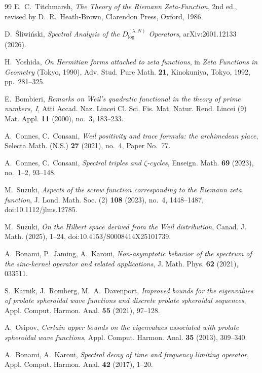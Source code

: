 \documentclass[11pt,a4paper]{article}
\begin{document}
\begin{thebibliography}{99}
E.~C.~Titchmarsh,
\emph{The Theory of the Riemann Zeta-Function}, 2nd ed., revised by
D.~R.~Heath-Brown, Clarendon Press, Oxford, 1986.

D.~\'Sliwi\'nski,
\emph{Spectral Analysis of the $D_{\log}^{(\lambda,N)}$ Operators},
arXiv:2601.12133 (2026).

H.~Yoshida,
\emph{On Hermitian forms attached to zeta functions}, in \emph{Zeta Functions
in Geometry} (Tokyo, 1990), Adv. Stud. Pure Math. \textbf{21}, Kinokuniya,
Tokyo, 1992, pp.~281--325.

E.~Bombieri,
\emph{Remarks on Weil's quadratic functional in the theory of prime numbers, I},
Atti Accad. Naz. Lincei Cl. Sci. Fis. Mat. Natur. Rend. Lincei (9) Mat. Appl.
\textbf{11} (2000), no.~3, 183--233.

A.~Connes, C.~Consani,
\emph{Weil positivity and trace formula: the archimedean place},
Selecta Math. (N.S.) \textbf{27} (2021), no.~4, Paper No.~77.

A.~Connes, C.~Consani,
\emph{Spectral triples and $\zeta$-cycles},
Enseign. Math. \textbf{69} (2023), no.~1--2, 93--148.

M.~Suzuki,
\emph{Aspects of the screw function corresponding to the Riemann zeta function},
J. Lond. Math. Soc. (2) \textbf{108} (2023), no.~4, 1448--1487,
doi:10.1112/jlms.12785.

M.~Suzuki,
\emph{On the Hilbert space derived from the Weil distribution},
Canad. J. Math. (2025), 1--24, doi:10.4153/S0008414X25101739.

A.~Bonami, P.~Jaming, A.~Karoui,
\emph{Non-asymptotic behavior of the spectrum of the sinc-kernel operator and
related applications}, J. Math. Phys. \textbf{62} (2021), 033511.

S.~Karnik, J.~Romberg, M.~A.~Davenport,
\emph{Improved bounds for the eigenvalues of prolate spheroidal wave functions
and discrete prolate spheroidal sequences},
Appl. Comput. Harmon. Anal. \textbf{55} (2021), 97--128.

A.~Osipov,
\emph{Certain upper bounds on the eigenvalues associated with prolate
spheroidal wave functions},
Appl. Comput. Harmon. Anal. \textbf{35} (2013), 309--340.

A.~Bonami, A.~Karoui,
\emph{Spectral decay of time and frequency limiting operator},
Appl. Comput. Harmon. Anal. \textbf{42} (2017), 1--20.


\end{thebibliography}
\end{document}
